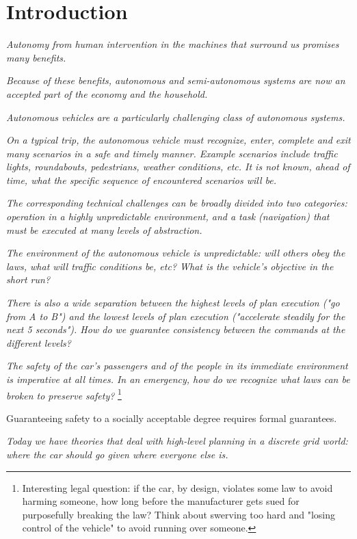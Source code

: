\section{Introduction}
\label{introduction}

{\it Autonomy from human intervention in the machines that surround us promises many benefits.}

{\it Because of these benefits, autonomous and semi-autonomous systems are now an accepted part of the economy and the household.}

{\it Autonomous vehicles are a particularly challenging class of autonomous systems.}

{\it On a typical trip, the autonomous vehicle must recognize, enter, complete and exit many scenarios in a safe and timely manner. Example scenarios include traffic lights, roundabouts, pedestrians, weather conditions, etc. 
It is not known, ahead of time, what the specific sequence of encountered scenarios will be.}

{\it The corresponding technical challenges can be broadly divided into two categories: operation in a highly unpredictable environment, and a task (navigation) that must be executed at many levels of abstraction.}

{\it The environment of the autonomous vehicle is unpredictable: will others obey the laws, what will traffic conditions be, etc? What is the vehicle's objective in the short run?}

{\it There is also a wide separation between the highest levels of plan execution ("go from A to B") and the lowest levels of plan execution ("accelerate steadily for the next 5 seconds"). How do we guarantee consistency between the commands at the different levels?}

{\it The safety of the car's passengers and of the people in its immediate environment is imperative at all times. In an emergency, how do we recognize what laws can be broken to preserve safety?}
\footnote{Interesting legal question: if the car, by design, violates some law to avoid harming someone, how long before the manufacturer gets sued for purposefully breaking the law? Think about swerving too hard and "losing control of the vehicle" to avoid running over someone.}

{Guaranteeing safety to a socially acceptable degree requires formal guarantees.}

{\it Today we have theories that deal with high-level planning in a discrete grid world: where the car should go given where everyone else is.}

